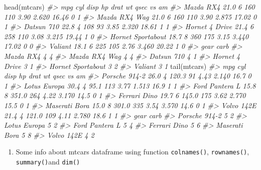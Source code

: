 \documentclass[
]{book}
\newenvironment{Shaded}{\begin{snugshade}}{\end{snugshade}}
\newcommand{\CommentTok}[1]{\textcolor[rgb]{0.56,0.35,0.01}{\textit{#1}}}
\newcommand{\FunctionTok}[1]{\textcolor[rgb]{0.00,0.00,0.00}{#1}}
\newcommand{\NormalTok}[1]{#1}
\providecommand{\tightlist}{%
  \setlength{\itemsep}{0pt}\setlength{\parskip}{0pt}}
\begin{document}
\begin{Shaded}
\begin{Highlighting}[]
\FunctionTok{head}\NormalTok{(mtcars)}
\CommentTok{\#\textgreater{}                    mpg cyl disp  hp drat    wt  qsec vs am}
\CommentTok{\#\textgreater{} Mazda RX4         21.0   6  160 110 3.90 2.620 16.46  0  1}
\CommentTok{\#\textgreater{} Mazda RX4 Wag     21.0   6  160 110 3.90 2.875 17.02  0  1}
\CommentTok{\#\textgreater{} Datsun 710        22.8   4  108  93 3.85 2.320 18.61  1  1}
\CommentTok{\#\textgreater{} Hornet 4 Drive    21.4   6  258 110 3.08 3.215 19.44  1  0}
\CommentTok{\#\textgreater{} Hornet Sportabout 18.7   8  360 175 3.15 3.440 17.02  0  0}
\CommentTok{\#\textgreater{} Valiant           18.1   6  225 105 2.76 3.460 20.22  1  0}
\CommentTok{\#\textgreater{}                   gear carb}
\CommentTok{\#\textgreater{} Mazda RX4            4    4}
\CommentTok{\#\textgreater{} Mazda RX4 Wag        4    4}
\CommentTok{\#\textgreater{} Datsun 710           4    1}
\CommentTok{\#\textgreater{} Hornet 4 Drive       3    1}
\CommentTok{\#\textgreater{} Hornet Sportabout    3    2}
\CommentTok{\#\textgreater{} Valiant              3    1}
\FunctionTok{tail}\NormalTok{(mtcars)}
\CommentTok{\#\textgreater{}                 mpg cyl  disp  hp drat    wt qsec vs am}
\CommentTok{\#\textgreater{} Porsche 914{-}2  26.0   4 120.3  91 4.43 2.140 16.7  0  1}
\CommentTok{\#\textgreater{} Lotus Europa   30.4   4  95.1 113 3.77 1.513 16.9  1  1}
\CommentTok{\#\textgreater{} Ford Pantera L 15.8   8 351.0 264 4.22 3.170 14.5  0  1}
\CommentTok{\#\textgreater{} Ferrari Dino   19.7   6 145.0 175 3.62 2.770 15.5  0  1}
\CommentTok{\#\textgreater{} Maserati Bora  15.0   8 301.0 335 3.54 3.570 14.6  0  1}
\CommentTok{\#\textgreater{} Volvo 142E     21.4   4 121.0 109 4.11 2.780 18.6  1  1}
\CommentTok{\#\textgreater{}                gear carb}
\CommentTok{\#\textgreater{} Porsche 914{-}2     5    2}
\CommentTok{\#\textgreater{} Lotus Europa      5    2}
\CommentTok{\#\textgreater{} Ford Pantera L    5    4}
\CommentTok{\#\textgreater{} Ferrari Dino      5    6}
\CommentTok{\#\textgreater{} Maserati Bora     5    8}
\CommentTok{\#\textgreater{} Volvo 142E        4    2}
\end{Highlighting}
\end{Shaded}

\begin{enumerate}
\def\labelenumi{\arabic{enumi}.}
\setcounter{enumi}{2}
\tightlist
\item
  Some info about mtcars dataframe using function \texttt{colnames()}, \texttt{rownames()}, \texttt{summary()}and \texttt{dim()}
\end{enumerate}
\end{document}
